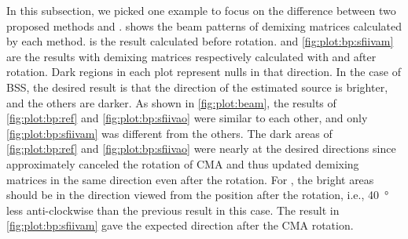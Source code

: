 \documentclass[sip,biber]{now-journal}
\begin{document}
In this subsection, we picked one example to focus on the difference between two proposed methods \SFIIVAo{} and \SFIIVAo{}.
 shows the beam patterns of demixing matrices calculated by each method.
 is the result calculated before rotation.
 and \cref{fig:plot:bp:sfiivam} are the results with demixing matrices respectively calculated with \SFIIVAm{} and \SFIIVAo{} after rotation.
Dark regions in each plot represent nulls in that direction.
In the case of BSS, the desired result is that the direction of the estimated source is brighter, and the others are darker.
As shown in \cref{fig:plot:beam}, the results of \cref{fig:plot:bp:ref} and \cref{fig:plot:bp:sfiivao} were similar to each other, and only \cref{fig:plot:bp:sfiivam} was different from the others.
The dark areas of \cref{fig:plot:bp:ref} and \cref{fig:plot:bp:sfiivao} were nearly at the desired directions since \SFIIVAo{} approximately canceled the rotation of CMA and thus updated demixing matrices in the same direction even after the rotation.
For \SFIIVAm{}, the bright areas should be in the direction viewed from the position after the rotation, i.e., \SI{40}{\degree} less anti-clockwise than the previous result in this case.
The result in \cref{fig:plot:bp:sfiivam} gave the expected direction after the CMA rotation.
\end{document}
